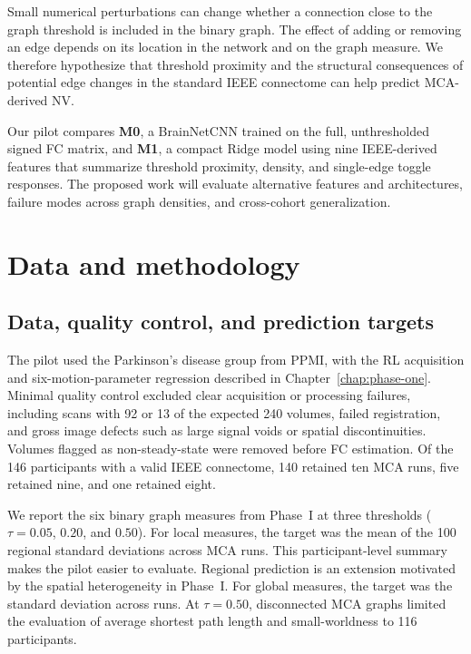 Small numerical perturbations can change whether a connection close to the graph threshold is included in the binary graph. The effect of adding or removing an edge depends on its location in the network and on the graph measure. We therefore hypothesize that threshold proximity and the structural consequences of potential edge changes in the standard IEEE connectome can help predict MCA-derived NV.

Our pilot compares \textbf{M0}, a BrainNetCNN trained on the full, unthresholded signed FC matrix, and \textbf{M1}, a compact Ridge model using nine IEEE-derived features that summarize threshold proximity, density, and single-edge toggle responses. The proposed work will evaluate alternative features and architectures, failure modes across graph densities, and cross-cohort generalization.


\section{Data and methodology}

\subsection{Data, quality control, and prediction targets}

The pilot used the Parkinson's disease group from PPMI, with the RL acquisition and six-motion-parameter regression described in Chapter~\ref{chap:phase-one}. Minimal quality control excluded clear acquisition or processing failures, including scans with 92 or 13 of the expected 240 volumes, failed registration, and gross image defects such as large signal voids or spatial discontinuities. Volumes flagged as non-steady-state were removed before FC estimation. Of the 146 participants with a valid IEEE connectome, 140 retained ten MCA runs, five retained nine, and one retained eight.

We report the six binary graph measures from Phase~I at three thresholds ($\tau=0.05$, $0.20$, and $0.50$). For local measures, the target was the mean of the 100 regional standard deviations across MCA runs. This participant-level summary makes the pilot easier to evaluate. Regional prediction is an extension motivated by the spatial heterogeneity in Phase~I. For global measures, the target was the standard deviation across runs. At $\tau=0.50$, disconnected MCA graphs limited the evaluation of average shortest path length and small-worldness to 116 participants.

